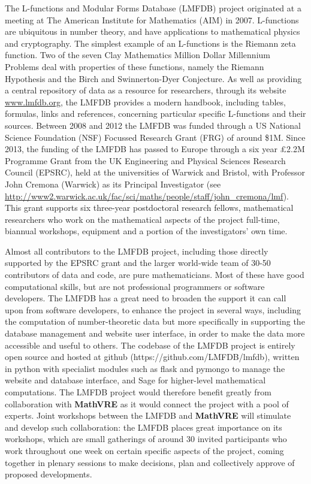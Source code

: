 \documentclass[a4paper,11pt]{article}
\newcommand{\XX}{\textbf{MathVRE}\xspace}
\newcommand{\TheProject}{\XX}
\begin{document}
The L-functions and Modular Forms Database (LMFDB) project originated
at a meeting at The American Institute for Mathematics (AIM) in 2007.
L-functions are ubiquitous in number theory, and have applications to
mathematical physics and cryptography. The simplest example of an
L-functions is the Riemann zeta function. Two of the seven Clay
Mathematics Million Dollar Millennium Problems deal with properties of
these functions, namely the Riemann Hypothesis and the Birch and
Swinnerton-Dyer Conjecture.  As well as providing a central repository
of data as a resource for researchers, through its website
\url{www.lmfdb.org}, the LMFDB provides a modern handbook, including
tables, formulas, links and references, concerning particular specific
L-functions and their sources.  Between 2008 and 2012 the LMFDB was
funded through a US National Science Foundation (NSF) Focussed
Research Grant (FRG) of around \$1M.  Since 2013, the funding of the
LMFDB has passed to Europe through a six year £2.2M Programme Grant
from the UK Engineering and Physical Sciences Research Council
(EPSRC), held at the universities of Warwick and Bristol, with
Professor John Cremona (Warwick) as its Principal Investigator (see
\url{http://www2.warwick.ac.uk/fac/sci/maths/people/staff/john_cremona/lmf}).
This grant supports six three-year postdoctoral research fellows,
mathematical researchers who work on the mathematical aspects of the
project full-time, biannual workshops, equipment and a portion of the
investigators' own time.

Almost all contributors to the LMFDB project, including those directly
supported by the EPSRC grant and the larger world-wide team of 30-50
contributors of data and code, are pure mathematicians.  Most of these
have good computational skills, but are not professional programmers
or software developers.  The LMFDB has a great need to broaden the
support it can call upon from software developers, to enhance the
project in several ways, including the computation of number-theoretic
data but more specifically in supporting the database management and
website user interface, in order to make the data more accessible and
useful to others.  The codebase of the LMFDB project is entirely open
source and hosted at github (https://github.com/LMFDB/lmfdb), written
in python with specialist modules such as flask and pymongo to manage
the website and database interface, and Sage for higher-level
mathematical computations.  The LMFDB project would therefore benefit
greatly from collaboration with \TheProject as it would
connect the project with a pool of experts.  Joint workshops between
the LMFDB and \TheProject will stimulate and develop such
collaboration: the LMFDB places great importance on its workshops,
which are small gatherings of around 30 invited participants who work
throughout one week on certain specific aspects of the project, coming
together in plenary sessions to make decisions, plan and collectively
approve of proposed developments.
\end{document}
